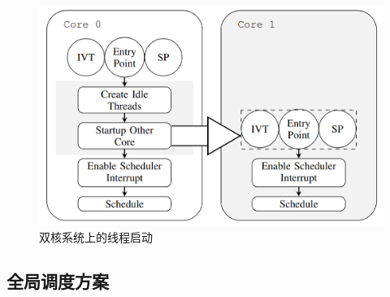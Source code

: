 \begin{figure}
\begin{tikzpicture}
    \end{tikzpicture}                                

\fi
\centering
\includegraphics[width=0.95\columnwidth]{translate/figures/threading-startup-render-2.png}
     \caption{双核系统上的线程启动}
     \label{fig:startup}
 \end{figure}

\subsection{全局调度方案}\label{sec:design:scheduling}





